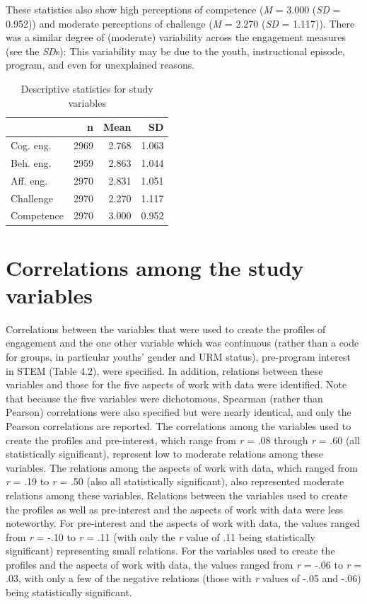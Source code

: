 \documentclass[]{msu-thesis}
\theoremstyle{definition}
\theoremstyle{definition}
\theoremstyle{definition}
\theoremstyle{remark}
\begin{document}
These statistics also show high perceptions of competence (\emph{M} =
3.000 (\emph{SD} = 0.952)) and moderate perceptions of challenge
(\emph{M} = 2.270 (\emph{SD} = 1.117)). There was a similar degree of
(moderate) variability across the engagement measures (see the
\emph{SD}s): This variability may be due to the youth, instructional
episode, program, and even for unexplained reasons.

\begin{table}

\caption{\label{tab:unnamed-chunk-7}Descriptive statistics for study variables}
\centering
\begin{tabular}[t]{lrrr}
\toprule
 & n & Mean & SD\\
\midrule
Cog. eng. & 2969 & 2.768 & 1.063\\
Beh. eng. & 2959 & 2.863 & 1.044\\
Aff. eng. & 2970 & 2.831 & 1.051\\
Challenge & 2970 & 2.270 & 1.117\\
Competence & 2970 & 3.000 & 0.952\\
\bottomrule
\end{tabular}
\end{table}

\section{Correlations among the study
variables}\label{correlations-among-the-study-variables}

Correlations between the variables that were used to create the profiles
of engagement and the one other variable which was continuous (rather
than a code for groups, in particular youths' gender and URM status),
pre-program interest in STEM (Table 4.2), were specified. In addition,
relations between these variables and those for the five aspects of work
with data were identified. Note that because the five variables were
dichotomous, Spearman (rather than Pearson) correlations were also
specified but were nearly identical, and only the Pearson correlations
are reported. The correlations among the variables used to create the
profiles and pre-interest, which range from \emph{r} = .08 through
\emph{r} = .60 (all statistically significant), represent low to
moderate relations among these variables. The relations among the
aspects of work with data, which ranged from \emph{r} = .19 to \emph{r}
= .50 (also all statistically significant), also represented moderate
relations among these variables. Relations between the variables used to
create the profiles as well as pre-interest and the aspects of work with
data were less noteworthy. For pre-interest and the aspects of work with
data, the values ranged from \emph{r} = -.10 to \emph{r} = .11 (with
only the \emph{r} value of .11 being statistically significant)
representing small relations. For the variables used to create the
profiles and the aspects of work with data, the values ranged from
\emph{r} = -.06 to \emph{r} = .03, with only a few of the negative
relations (those with \emph{r} values of -.05 and -.06) being
statistically significant.
\end{document}
